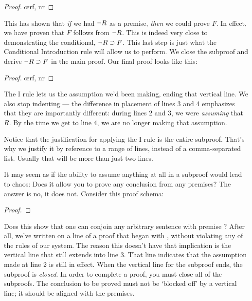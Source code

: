 \begin{proof}
	  
	\open
		 
		\oe{rf, nr}
	\close
\end{proof}

This has shown that \emph{if} we had $\neg R$ as a premise, \emph{then} we could prove $F$. In effect, we have proven that $F$ follows from $\neg R$. This is indeed very close to demonstrating the conditional, $\neg R \supset F$. This last step is just what the Conditional Introduction rule will allow us to perform. We close the subproof and derive $\neg R \supset F$ in the main proof. Our final proof looks like this:

\begin{proof}
	\open
		\oe{rf, nr}
	\close
\end{proof}

The {\eif}I rule lets us  the assumption we'd been making, ending that vertical line. We also stop indenting --- the difference in placement of lines 3 and 4 emphasizes that they are importantly different: during lines 2 and 3, we were \emph{assuming} that \enot $R$. By the time we get to line 4, we are no longer making that assumption.

Notice that the justification for applying the {\eif}I rule is the entire subproof. That's why we justify it by reference to a range of lines, instead of a comma-separated list. Usually that will be more than just two lines.

It may seem as if the ability to assume anything at all in a subproof would lead to chaos: Does it allow you to prove any conclusion from any premises? The answer is no, it does not. Consider this proof schema:

\begin{proof}
	\metaA{}
	\open
		\metaB{}
		 
	\close
\end{proof}

Does this show that one can conjoin any arbitrary sentence \metaB{} with premise \metaA{}? After all, we've written \metaB{}\eand\metaA{} on a line of a proof that began with \metaA{}, without violating any of the rules of our system. The reason this doesn't have that implication is the vertical line that still extends into line 3. That line indicates that the assumption made at line 2 is still in effect. When the vertical line for the subproof ends, the subproof is \emph{closed}. In order to complete a proof, you must close all of the subproofs. The conclusion to be proved must not be `blocked off' by a vertical line; it should be aligned with the premises.

